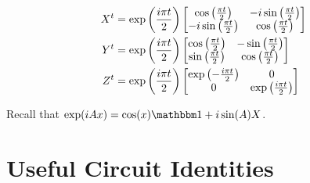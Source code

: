 \documentclass[a4paper,landscape,columns=3]{CheatSheet}
\begin{document}
\begin{align*}
X^{t} &= \exp\left(\frac{i\pi t}{2}\right)
\begin{bmatrix}
\cos\left(\frac{\pi t}{2}\right) & -i\sin\left(\frac{\pi t}{2}\right) \\
-i\sin\left(\frac{\pi t}{2}\right) & \cos\left(\frac{\pi t}{2}\right) \\
\end{bmatrix}\\
Y^{t} &= \exp\left(\frac{i\pi t}{2}\right)
\begin{bmatrix}
\cos\left(\frac{\pi t}{2}\right) & -\sin\left(\frac{\pi t}{2}\right) \\
\sin\left(\frac{\pi t}{2}\right) & \cos\left(\frac{\pi t}{2}\right) \\
\end{bmatrix}\\
Z^{t} &= \exp\left(\frac{i\pi t}{2}\right)
\begin{bmatrix}
\exp\left(-\frac{i\pi t}{2}\right) & 0 \\
0 & \exp\left(\frac{i\pi t}{2}\right) \\
\end{bmatrix}\\
\end{align*}

Recall that \(\exp(iAx) = \cos(x)\one + i\sin(A)X\).





\section{Useful Circuit Identities}

\end{document}
